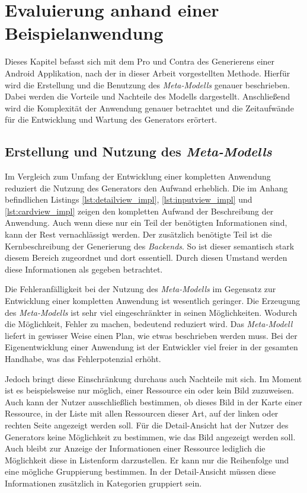 \chapter{Evaluierung anhand einer Beispielanwendung}
Dieses Kapitel befasst sich mit dem Pro und Contra des Generierens einer Android Applikation, nach der in dieser Arbeit vorgestellten Methode.
Hierfür wird die Erstellung und die Benutzung des \textit{Meta-Modells} genauer beschrieben. Dabei werden die Vorteile und Nachteile des Modells dargestellt. Anschließend wird die Komplexität der Anwendung genauer betrachtet und die Zeitaufwände für die Entwicklung und Wartung des Generators erörtert.

\section{Erstellung und Nutzung des \textit{Meta-Modells}}

Im Vergleich zum Umfang der Entwicklung einer kompletten Anwendung reduziert die Nutzung des Generators den Aufwand erheblich. Die im Anhang befindlichen Listings \ref{lst:detailview_impl}, \ref{lst:inputview_impl} und \ref{lst:cardview_impl} zeigen den kompletten Aufwand der Beschreibung der Anwendung. Auch wenn diese nur ein Teil der benötigten Informationen sind, kann der Rest vernachlässigt werden. Der zusätzlich benötigte Teil ist die Kernbeschreibung der Generierung des \textit{Backends}. So ist dieser semantisch stark diesem Bereich zugeordnet und dort essentiell. Durch diesen Umstand werden diese Informationen als gegeben betrachtet.

Die Fehleranfälligkeit bei der Nutzung des \textit{Meta-Modells} im Gegensatz zur Entwicklung einer kompletten Anwendung ist wesentlich geringer. Die Erzeugung des \textit{Meta-Modells} ist sehr viel eingeschränkter in seinen Möglichkeiten. Wodurch die Möglichkeit, Fehler zu machen, bedeutend reduziert wird. Das \textit{Meta-Modell} liefert in gewisser Weise einen Plan, wie etwas beschrieben werden muss. Bei der Eigenentwicklung einer Anwendung ist der Entwickler viel freier in der gesamten Handhabe, was das Fehlerpotenzial erhöht.

Jedoch bringt diese Einschränkung durchaus auch Nachteile mit sich. Im Moment ist es beispielsweise nur möglich, einer Ressource ein oder kein Bild zuzuweisen. Auch kann der Nutzer ausschließlich bestimmen, ob dieses Bild in der Karte einer Ressource, in der Liste mit allen Ressourcen dieser Art, auf der linken oder rechten Seite angezeigt werden soll. Für die Detail-Ansicht hat der Nutzer des Generators keine Möglichkeit zu bestimmen, wie das Bild angezeigt werden soll.
Auch bleibt zur Anzeige der Informationen einer Ressource lediglich die Möglichkeit diese in Listenform darzustellen. Er kann nur die Reihenfolge und eine mögliche Gruppierung bestimmen. In der Detail-Ansicht müssen diese Informationen zusätzlich in Kategorien gruppiert sein. 

